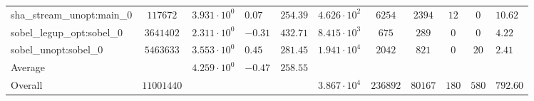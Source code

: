\begin{tabular}{|l|c|HHc|c|c|c|c|cH|}
sha\_stream\_unopt:main\_0                      & $ 117672   $ & $ 3.931 \cdot 10^{0} $ & $ 0.07  $ & $ 254.39 $ & $ 4.626 \cdot 10^{2}  $ & $ 6254   $ & $ 2394  $ & $ 12  $ & $ 0   $ & $ 10.62   $ \\
sobel\_legup\_opt:sobel\_0                      & $ 3641402  $ & $ 2.311 \cdot 10^{0} $ & $ -0.31 $ & $ 432.71 $ & $ 8.415 \cdot 10^{3}  $ & $ 675    $ & $ 289   $ & $ 0   $ & $ 0   $ & $ 4.22    $ \\
sobel\_unopt:sobel\_0                           & $ 5463633  $ & $ 3.553 \cdot 10^{0} $ & $ 0.45  $ & $ 281.45 $ & $ 1.941 \cdot 10^{4}  $ & $ 2042   $ & $ 821   $ & $ 0   $ & $ 20  $ & $ 2.41    $ \\
\hline
Average                                         & $          $ & $ 4.259 \cdot 10^{0} $ & $ -0.47 $ & $ 258.55 $ & $                     $ & $        $ & $       $ & $     $ & $     $ & $         $ \\
\hline
Overall                                         & $ 11001440 $ & $                    $ & $       $ & $        $ & $ 3.867 \cdot 10^{4}  $ & $ 236892 $ & $ 80167 $ & $ 180 $ & $ 580 $ & $ 792.60  $ \\
\hline
\end{tabular}
